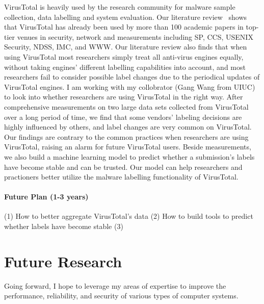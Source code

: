 \documentclass[10pt]{article}
\begin{document}
VirusTotal is heavily used by the research community for malware sample collection,
data labelling and system evaluation. 
Our literature review~\cite{vt-jianjun} shows that 
VirusTotal has already been used by more than 100 academic 
papers in top-tier venues 
in security, network and measurements including SP, CCS, 
USENIX Security, NDSS, IMC, and WWW.
Our literature review also finds that when using VirusTotal 
most researchers simply treat all anti-virus engines equally, 
without taking engines' different labelling capabilities into account, 
and most researchers fail to consider possible label changes 
due to the periodical updates of VirusTotal engines. 
I am working with my collobrator (Gang Wang from UIUC) to look into whether 
researchers are using VirusTotal in the right way. 
After comprehensive measurements on two large data sets collected from VirusTotal
over a long period of time, 
we find that some vendors' 
labeling decisions are highly influenced by others,  
and label changes are very common on VirusTotal.
Our findings are contrary to the common practices 
when researchers are using VirusTotal, 
raising an alarm for future VirusTotal users.
Beside measurements, we also build a machine learning model
to predict whether a submission's labels have become stable and 
can be trusted.
Our model can help researchers and practioners 
better utilize the malware labelling functionality of VirusTotal. 

\vspace{-.1in}
\paragraph{Future Plan (1-3 years)}
(1) How to better aggregate VirusTotal's data
(2) How to build tools to predict whether labels have become stable
(3)

\section{Future Research}

Going forward, I hope to leverage my areas of expertise to improve the performance, 
reliability, and security of various types of computer systems. 

\vspace{-.1in}
\end{document}
